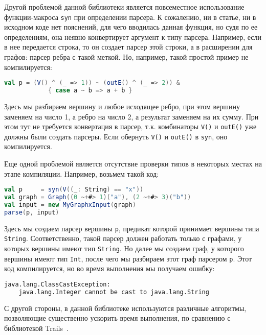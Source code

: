 Другой проблемой данной библиотеки является повсеместное использование функции-макроса \verb|syn| при определении парсера.
К сожалению, ни в статье, ни в исходном коде нет пояснений, для чего вводилась данная функция, но судя по ее определениям, она неявно конвертирует аргумент к типу парсера. Например, если в нее передается строка, то он создает парсер этой строки, а в расширении для графов: парсер ребра с такой меткой.
Но, например, такой простой пример не компилируется:
\begin{lstlisting}[language=Scala, numbers=none, frame=none]
val p = (V() ^ (_ => 1)) ~ (outE() ^ (_ => 2)) &
            { case a ~ b => a + b }
\end{lstlisting}
Здесь мы разбираем вершину и любое исходящее ребро, при этом вершину заменяем на число 1, а ребро на число 2, а результат заменяем на их сумму.
При этом тут не требуется конвертация в парсер, т.к. комбинаторы \verb|V()| и \verb|outE()| уже должны были создать парсеры. Если обернуть \verb|V()| и \verb|outE()| в \verb|syn|, оно компилируется.

Еще одной проблемой является отсутствие проверки типов в некоторых местах на этапе компиляции.
Например, возьмем такой код:

\begin{nobreaks}
\begin{lstlisting}[language=Scala, numbers=none, frame=none]
val p     = syn(V((_: String) == "x"))
val graph = Graph((0 ~+#> 1)("a"), (2 ~+#> 3)("b"))
val input = new MyGraphxInput(graph)
parse(p, input)
\end{lstlisting}
\end{nobreaks}

Здесь мы создаем парсер вершины \verb|p|, предикат которой принимает вершины типа \verb|String|.
Соответственно, такой парсер должен работать только с графами, у которых вершины имеют тип \verb|String|.
Но далее мы создаем граф, у которого вершины имеют тип \verb|Int|, после чего мы разбираем этот граф парсером \verb|p|.
Этот код компилируется, но во время выполнения мы получаем ошибку:
\begin{lstlisting}[language=TeX]
java.lang.ClassCastException: 
    java.lang.Integer cannot be cast to java.lang.String
\end{lstlisting}

С другой стороны, в данной библиотеке используются различные алгоритмы, позволяющие существенно ускорить время выполнения, по сравнению с библиотекой Trails~\cite{MeerkatGraphs}. 

